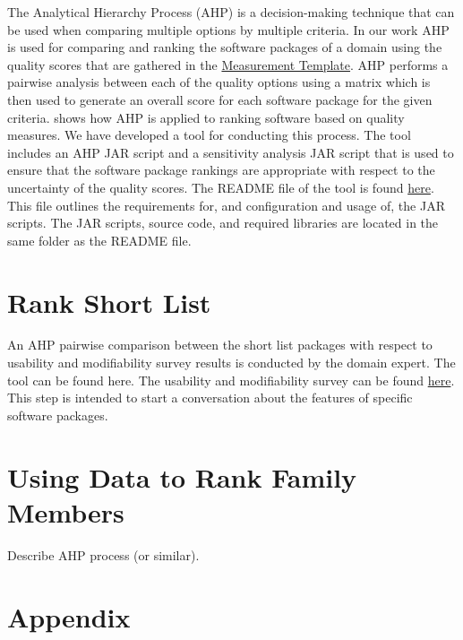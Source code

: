 \documentclass[letterpaper,cleveref]{lipics-v2019}
\theoremstyle{definition}
\begin{document}
The Analytical Hierarchy Process (AHP) is a decision-making technique that can
be used when comparing multiple options by multiple criteria. In our work AHP is
used for comparing and ranking the software packages of a domain using the
quality scores that are gathered in the
\href{https://github.com/smiths/AIMSS/blob/master/StateOfPractice/Methodology/Combined_MeasurementTemplate_EmpiricalMeasures.xlsx}
{Measurement Template}. AHP performs a pairwise analysis between each of the
quality options using a matrix which is then used to generate an overall score
for each software package for the given criteria. \cite{SmithEtAl2016} shows how
AHP is applied to ranking software based on quality measures. We have developed
a tool for conducting this process. The tool includes an AHP JAR script and a
sensitivity analysis JAR script that is used to ensure that the software package
rankings are appropriate with respect to the uncertainty of the quality
scores. The README file of the tool is found
\href{https://github.com/smiths/AIMSS/blob/master/StateOfPractice/AHP2020/LBM/README.txt}{here}. This
file outlines the requirements for, and configuration and usage of, the JAR
scripts. The JAR scripts, source code, and required libraries are located in the
same folder as the README file.

\section{Rank Short List} \label{SecRankShortList}

An AHP pairwise comparison between the short list packages with respect to
usability and modifiability survey results is conducted by the domain
expert. The tool can be found here. The usability and modifiability survey can
be found
\href{https://github.com/smiths/AIMSS/blob/master/StateOfPractice/Methodology/Experiments.pdf}
{here}. This step is intended to start a conversation about the features of
specific software packages.

\section{Using Data to Rank Family Members}

Describe AHP process (or similar).

\appendix

\section{Appendix}
\end{document}
